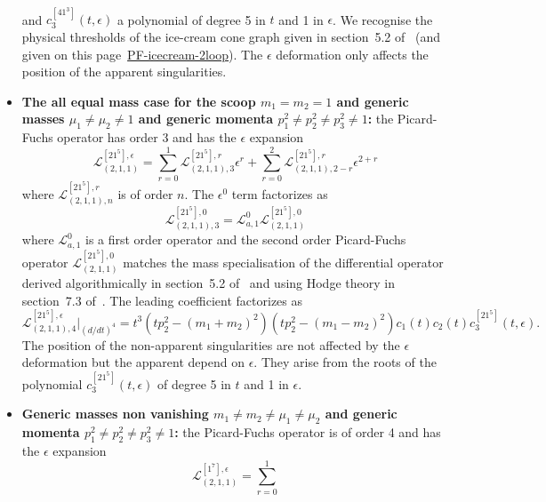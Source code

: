 \documentclass[a4paper,12pt]{article}
\numberwithin{equation}{section}
\numberwithin{figure}{section}
\begin{document}
\begin{itemize}
\begin{multline}
	\end{multline}
	and $c^{[41^3]}_3(t,\epsilon)$ a polynomial of  degree 5 in $t$ and 1 in
	$\epsilon$. We recognise the physical thresholds of the ice-cream
	cone graph given in section~5.2 of~\cite{Lairez:2022zkj} (and given
	on this
	page~\href{https://nbviewer.org/github/pierrevanhove/PicardFuchs/blob/main/PF-icecream-2loop.ipynb}{PF-icecream-2loop}). The
	$\epsilon$ deformation only affects the position of the apparent singularities. 
	\item \textbf{The all equal mass case for the scoop
		$m_1=m_2=1$ and generic masses $\mu_1\neq\mu_2\neq1$ and generic
		momenta  $p_1^2\neq p_2^2\neq
		p_3^2\neq 1$:}  the Picard-Fuchs operator has order 3 and has the
	$\epsilon$ expansion
	\begin{equation}
		\mathscr{L}_{(2,1,1)}^{[21^5],\epsilon}=\sum_{r=0}^1
		\mathscr{L}_{(2,1,1),3}^{[21^5],r} \epsilon^r+ \sum_{r=0}^2   \mathscr{L}_{(2,1,1),2-r}^{[21^5],r} \epsilon^{2+r}
	\end{equation}
	where $ \mathscr{L}_{(2,1,1),n}^{[21^5],r}$  is of order $n$. The
	$\epsilon^0$ term factorizes as
	\begin{equation}
		\mathscr{L}_{(2,1,1),3}^{[21^5],0}=\mathscr{L}_{a,1}^0 \mathscr{L}_{(2,1,1)}^{[21^5] ,0      }
	\end{equation}
	where $\mathscr{L}_{a,1}^0$ is a first order operator and the second order
	Picard-Fuchs operator  $\mathscr{L}_{(2,1,1)}^{[21^5] ,0}
	$ matches the mass specialisation of the differential
	operator derived algorithmically in section~5.2
	of~\cite{Lairez:2022zkj} and using Hodge theory in
	section~7.3 of~\cite{Doran:2023yzu}.
	The leading coefficient factorizes as
	\begin{equation}
		\mathscr{L}_{(2,1,1),4}^{[21^5],\epsilon}\Big|_{(d/dt)^4}=t^3
		(tp_2^2-(m_1+m_2)^2)(tp_2^2-(m_1-m_2)^2) c_1(t)
		c_2(t) c^{[21^5]}_3(t,\epsilon)   .
	\end{equation}
	The position of the non-apparent singularities are
	not affected by the $\epsilon$ deformation but the
	apparent depend on $\epsilon$. They arise from the
	roots of the polynomial $c^{[21^5]}_3(t,\epsilon)   $ of
	degree 5 in $t$ and 1 in $\epsilon$.
	\item \textbf{Generic masses non vanishing
		$m_1\neq m_2\neq\mu_1\neq\mu_2$ and generic
		momenta  $p_1^2\neq p_2^2\neq
		p_3^2\neq 1$:}  the Picard-Fuchs operator is of order 4 and has the
	$\epsilon$ expansion
	\begin{equation}
		\mathscr{L}_{(2,1,1)}^{[1^7],\epsilon}=\sum_{r=0}^1

\end{equation}
\end{itemize}
\end{document}
